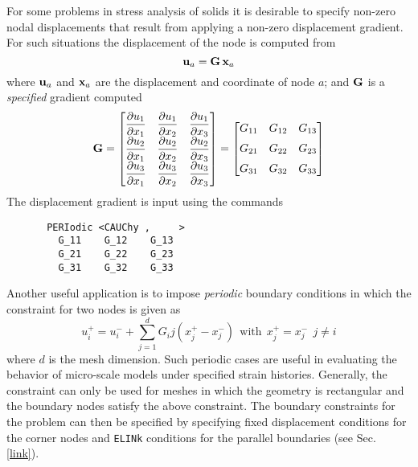 \headb


For some problems in stress analysis of solids
it is desirable to specify non-zero nodal displacements
that result from applying a non-zero displacement gradient.  For such situations
the displacement of the node is computed from
\begin{displaymath}
\mathbf{u}_a = \mathbf{G} \, \mathbf{x}_a
\end{displaymath}
where $\mathbf{u}_a$ and $\mathbf{x}_a$ are the displacement and coordinate of node $a$;
and $\mathbf{G}$ is a \textit{specified} gradient computed
\begin{displaymath}
\mathbf{G} = \begin{bmatrix}
\dfrac{\partial {u_1}}{\partial {x_1}} & \dfrac{\partial {u_1}}{\partial {x_2}} & \dfrac{\partial {u_1}}{\partial {x_3}} \\
\dfrac{\partial {u_2}}{\partial {x_1}} & \dfrac{\partial {u_2}}{\partial {x_2}} & \dfrac{\partial {u_2}}{\partial {x_3}} \\
\dfrac{\partial {u_3}}{\partial {x_1}} & \dfrac{\partial {u_3}}{\partial {x_2}} & \dfrac{\partial {u_3}}{\partial {x_3}} \end{bmatrix}
= \begin{bmatrix}
G_{11} & G_{12} & G_{13} \\[+6pt]
G_{21} & G_{22} & G_{23} \\[+6pt]
G_{31} & G_{32} & G_{33} \end{bmatrix}
\end{displaymath}
The displacement gradient is input using the commands
\begin{verbatim}
       PERIodic <CAUChy ,     >
         G_11    G_12    G_13
         G_21    G_22    G_23
         G_31    G_32    G_33
\end{verbatim}

Another useful application is to impose \textit{periodic} boundary conditions
in which the constraint for two nodes is given as
\begin{displaymath}
u_i^+ = u_i^- + \sum_{j=1}^d G_ij ( x_j^+ - x_j^-)
~~\mbox{with}~~ x_j^+ = x_j^- ~~ j \ne i
\end{displaymath}
where $d$ is the mesh dimension.  Such periodic cases are useful in evaluating
the behavior of micro-scale models under specified strain histories.  Generally,
the constraint can only be used for meshes in which the geometry is rectangular and the boundary nodes satisfy the above constraint.  The boundary
constraints for the problem can then be specified by specifying fixed
displacement conditions for the corner nodes and \texttt{ELINk} conditions
for the parallel boundaries (see Sec. \ref{link}).

